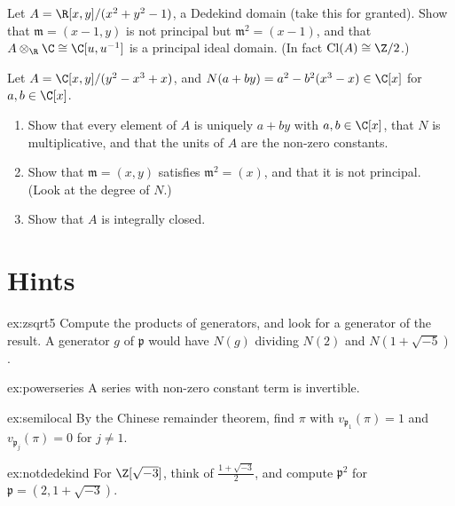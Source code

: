 \begin{exercise}[$\star\star$]\label{ex:circle}
Let $A=\R[x,y]/(x^2+y^2-1)$, a Dedekind domain (take this for granted). Show that $\mathfrak m=(x-1,y)$ is not principal but $\mathfrak m^2=(x-1)$, and that $A\otimes_\R\C\cong\C[u,u^{-1}]$ is a principal ideal domain.
(In fact $\operatorname{Cl}(A)\cong\Z/2$.)
\end{exercise}

\begin{exercise}[$\star\star\star$]\label{ex:cubicnotprincipal}
Let $A=\C[x,y]/(y^2-x^3+x)$, and $N(a+by)=a^2-b^2(x^3-x)\in\C[x]$ for $a,b\in\C[x]$.
\begin{enumerate}[label=(\alph*)]
\item Show that every element of $A$ is uniquely $a+by$ with $a,b\in\C[x]$, that $N$ is multiplicative, and that the units of $A$ are the non-zero constants.
\item Show that $\mathfrak m=(x,y)$ satisfies $\mathfrak m^2=(x)$, and that it is not principal. (Look at the degree of $N$.)
\item Show that $A$ is integrally closed.
\end{enumerate}
\end{exercise}

\section{Hints}

\begin{hint}{ex:zsqrt5}
Compute the products of generators, and look for a generator of the result. A generator $g$ of $\mathfrak p$ would have $N(g)$ dividing $N(2)$ and $N(1+\sqrt{-5})$.
\end{hint}

\begin{hint}{ex:powerseries}
A series with non-zero constant term is invertible.
\end{hint}

\begin{hint}{ex:semilocal}
By the Chinese remainder theorem, find $\pi$ with $v_{\mathfrak p_1}(\pi)=1$ and $v_{\mathfrak p_j}(\pi)=0$ for $j\ne1$.
\end{hint}

\begin{hint}{ex:notdedekind}
For $\Z[\sqrt{-3}]$, think of $\frac{1+\sqrt{-3}}2$, and compute $\mathfrak p^2$ for $\mathfrak p=(2,1+\sqrt{-3})$.
\end{hint}

